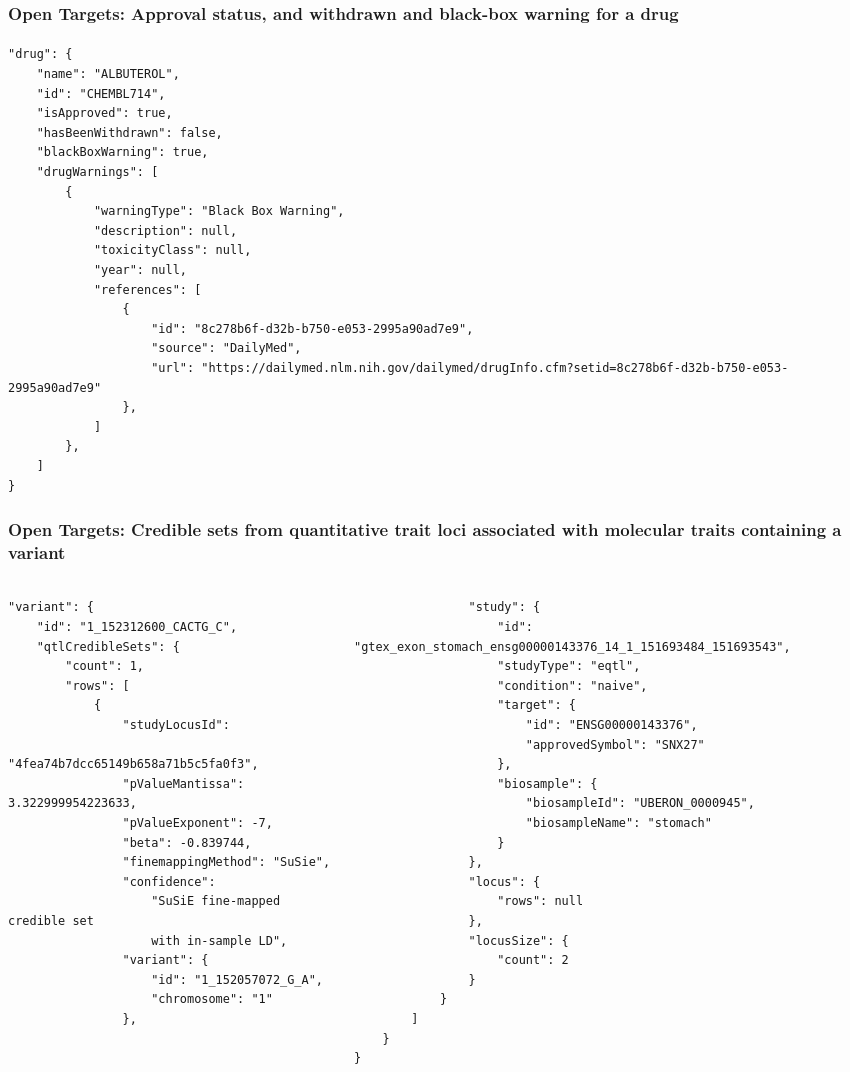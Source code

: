 \documentclass[aspectratio=169,xcolor=dvipsnames]{beamer}
\begin{document}
\begin{frame}[fragile,t]
  \frametitle{Open Targets: Approval status, and withdrawn and black-box warning for a drug}
  \framesubtitle{}
  \tiny
\begin{verbatim}
"drug": {
    "name": "ALBUTEROL",
    "id": "CHEMBL714",
    "isApproved": true,
    "hasBeenWithdrawn": false,
    "blackBoxWarning": true,
    "drugWarnings": [
        {
            "warningType": "Black Box Warning",
            "description": null,
            "toxicityClass": null,
            "year": null,
            "references": [
                {
                    "id": "8c278b6f-d32b-b750-e053-2995a90ad7e9",
                    "source": "DailyMed",
                    "url": "https://dailymed.nlm.nih.gov/dailymed/drugInfo.cfm?setid=8c278b6f-d32b-b750-e053-2995a90ad7e9"
                },
            ]
        },
    ]
}
\end{verbatim}
\end{frame}

\begin{frame}[fragile,t]
  \frametitle{Open Targets: Credible sets from quantitative trait loci associated with molecular traits containing a variant}
  \framesubtitle{}
  \tiny
  \begin{columns}[t]
    \begin{column}{0.3\textwidth}
\begin{verbatim}
"variant": {
    "id": "1_152312600_CACTG_C",
    "qtlCredibleSets": {
        "count": 1,
        "rows": [
            {
                "studyLocusId":
                    "4fea74b7dcc65149b658a71b5c5fa0f3",
                "pValueMantissa": 3.322999954223633,
                "pValueExponent": -7,
                "beta": -0.839744,
                "finemappingMethod": "SuSie",
                "confidence":
                    "SuSiE fine-mapped credible set
                    with in-sample LD",
                "variant": {
                    "id": "1_152057072_G_A",
                    "chromosome": "1"
                },
\end{verbatim}
    \end{column}
    \begin{column}{0.7\textwidth}
\begin{verbatim}
                "study": {
                    "id": "gtex_exon_stomach_ensg00000143376_14_1_151693484_151693543",
                    "studyType": "eqtl",
                    "condition": "naive",
                    "target": {
                        "id": "ENSG00000143376",
                        "approvedSymbol": "SNX27"
                    },
                    "biosample": {
                        "biosampleId": "UBERON_0000945",
                        "biosampleName": "stomach"
                    }
                },
                "locus": {
                    "rows": null
                },
                "locusSize": {
                    "count": 2
                }
            }
        ]
    }
}
\end{verbatim}
    \end{column}
  \end{columns}
\end{frame}
\end{document}

